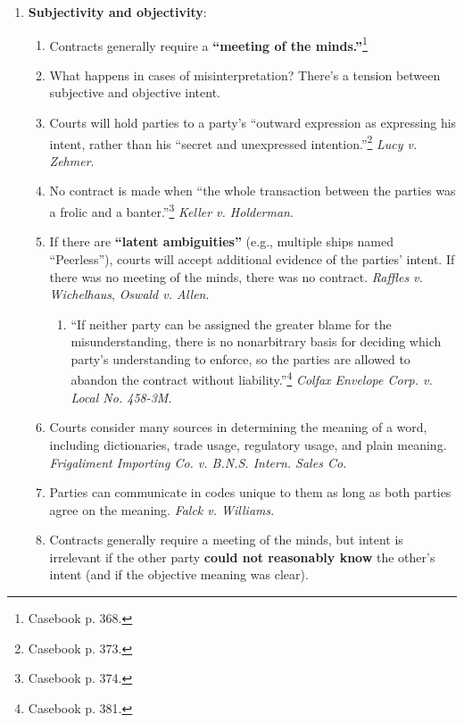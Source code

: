 \begin{enumerate}
    \item \textbf{Subjectivity and objectivity}:
    \begin{enumerate}
        \item Contracts generally require a \textbf{``meeting of the 
        minds.''}\footnote{Casebook p. 368.}
        \item What happens in cases of misinterpretation? There's a tension 
        between subjective and objective intent.
        \item Courts will hold parties to a party's ``outward expression as 
        expressing his intent, rather than his ``secret and unexpressed 
        intention.''\footnote{Casebook p. 373.} \emph{Lucy v. Zehmer}.
        \item No contract is made when ``the whole transaction between the 
        parties was a frolic and a banter.''\footnote{Casebook p. 374.} 
        \emph{Keller v.  Holderman}.
        \item If there are \textbf{``latent ambiguities''} (e.g., multiple 
        ships named ``Peerless''), courts will accept additional evidence of 
        the parties' intent. If there was no meeting of the minds, there was 
        no contract. \emph{Raffles v. Wichelhaus}, \emph{Oswald v. Allen}.
        \begin{enumerate}
            \item ``If neither party can be assigned the greater blame for the 
            misunderstanding, there is no nonarbitrary basis for deciding 
            which party's understanding to enforce, so the parties are allowed 
            to abandon the contract without liability.''\footnote{Casebook p. 
            381.} \emph{Colfax Envelope Corp. v. Local No. 458-3M}.
        \end{enumerate}
        \item Courts consider many sources in determining the meaning of a 
        word, including dictionaries, trade usage, regulatory usage, and plain 
        meaning.  \emph{Frigaliment Importing Co. v. B.N.S. Intern. Sales Co.}
        \item Parties can communicate in codes unique to them as long as both 
        parties agree on the meaning. \emph{Falck v. Williams}.
        \item Contracts generally require a meeting of the minds, but intent 
        is irrelevant if the other party \textbf{could not reasonably know} 
        the other's intent (and if the objective meaning was clear). 

\end{enumerate}
\end{enumerate}
